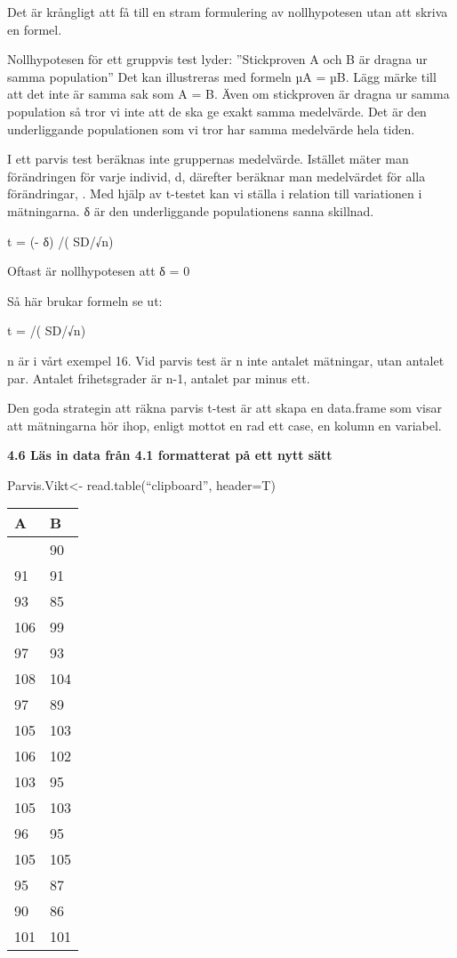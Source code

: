 \documentclass[
  letterpaper,
  DIV=11,
  numbers=noendperiod]{scrartcl}
\begin{document}
Det är krångligt att få till en stram formulering av nollhypotesen utan
att skriva en formel.

Nollhypotesen för ett gruppvis test lyder: ''Stickproven A och B är
dragna ur samma population'' Det kan illustreras med formeln µA = µB.
Lägg märke till att det inte är samma sak som A = B. Även om stickproven
är dragna ur samma population så tror vi inte att de ska ge exakt samma
medelvärde. Det är den underliggande populationen som vi tror har samma
medelvärde hela tiden.

I ett parvis test beräknas inte gruppernas medelvärde. Istället mäter
man förändringen för varje individ, d, därefter beräknar man medelvärdet
för alla förändringar, . Med hjälp av t-testet kan vi ställa i relation
till variationen i mätningarna. δ är den underliggande populationens
sanna skillnad.

t = (- δ) /( SD/√n)

Oftast är nollhypotesen att δ = 0

Så här brukar formeln se ut:

t = /( SD/√n)

n är i vårt exempel 16. Vid parvis test är n inte antalet mätningar,
utan antalet par. Antalet frihetsgrader är n-1, antalet par minus ett.

Den goda strategin att räkna parvis t-test är att skapa en data.frame
som visar att mätningarna hör ihop, enligt mottot en rad ett case, en
kolumn en variabel.

\textbf{4.6 Läs in data från 4.1 formatterat på ett nytt sätt}

Parvis.Vikt\textless- read.table(``clipboard'', header=T)

\begin{longtable}[]{@{}ll@{}}
\toprule\noalign{}
A & B \\
\midrule\noalign{}
\endhead
\bottomrule\noalign{}
\endlastfoot
90 & 90 \\
91 & 91 \\
93 & 85 \\
106 & 99 \\
97 & 93 \\
108 & 104 \\
97 & 89 \\
105 & 103 \\
106 & 102 \\
103 & 95 \\
105 & 103 \\
96 & 95 \\
105 & 105 \\
95 & 87 \\
90 & 86 \\
101 & 101 \\
\end{longtable}
\end{document}
